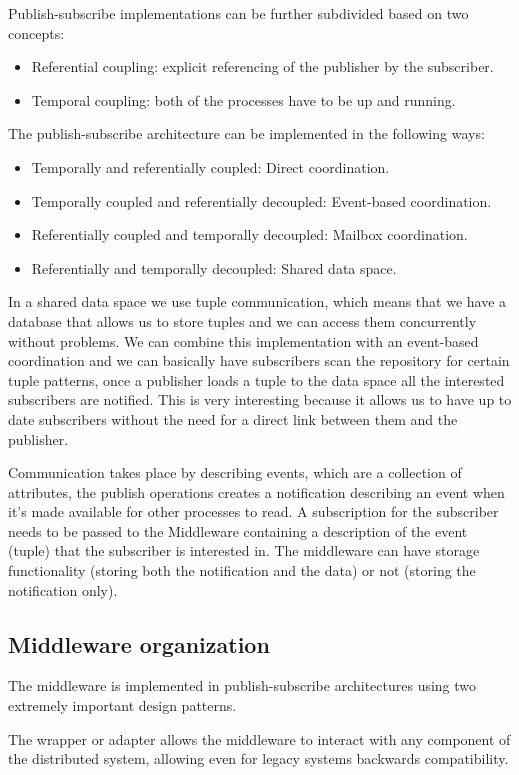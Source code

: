 Publish-subscribe implementations can be further subdivided based on two concepts:
\begin{itemize}
    \item Referential coupling: explicit referencing of the publisher by the subscriber.
    \item Temporal coupling: both of the processes have to be up and running.
\end{itemize}
The publish-subscribe architecture can be implemented in the following ways:
\begin{itemize}
    \item Temporally and referentially coupled: Direct coordination.
    \item Temporally coupled and referentially decoupled: Event-based coordination.
    \item Referentially coupled and temporally decoupled: Mailbox coordination.
    \item Referentially and temporally decoupled: Shared data space.
\end{itemize}
In a shared data space we use tuple communication, which means that we have a database that allows us to store tuples and we can access them concurrently without problems. We can combine this implementation with an event-based coordination and we can basically have subscribers scan the repository for certain tuple patterns, once a publisher loads a tuple to the data space all the interested subscribers are notified. This is very interesting because it allows us to have up to date subscribers without the need for a direct link between them and the publisher.

Communication takes place by describing events, which are a collection of attributes, the publish operations creates a notification describing an event when it's made available for other processes to read. A subscription for the subscriber needs to be passed to the Middleware containing a description of the event (tuple) that the subscriber is interested in. The middleware can have storage functionality (storing both the notification and the data) or not (storing the notification only).

\subsection{Middleware organization}
The middleware is implemented in publish-subscribe architectures using two extremely important design patterns.

The wrapper or adapter allows the middleware to interact with any component of the distributed system, allowing even for legacy systems backwards compatibility.

